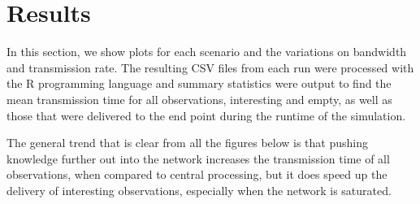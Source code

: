 \section{Results}\label{sim:res}
In this section, we show plots for each scenario and the variations on bandwidth and transmission rate. The resulting CSV files from each run were processed with the R programming language \cite{rlang} and summary statistics were output to find the mean transmission time for all observations, interesting and empty, as well as those that were delivered to the end point during the runtime of the simulation.

The general trend that is clear from all the figures below is that pushing knowledge further out into the network increases the transmission time of all observations, when compared to central processing, but it does speed up the delivery of interesting observations, especially when the network is saturated.


